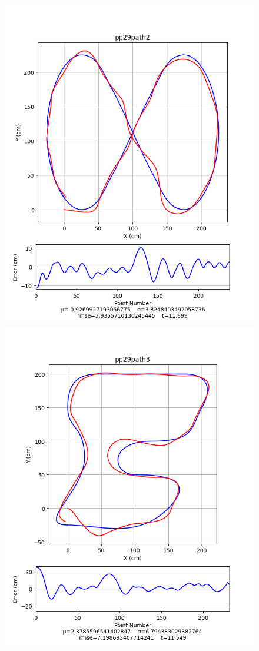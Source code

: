\documentclass[12pt]{article}
\begin{document}
\begin{flushleft}
\begin{figure}[H]
\includegraphics[width=\linewidth]{images/pathData/pppath2}
\endminipage\\
\includegraphics[width=\linewidth]{images/pathData/pppath3}

\end{figure}
\end{flushleft}
\end{document}
